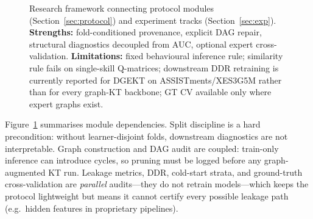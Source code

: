 \documentclass[runningheads]{llncs}
\newcommand{\DDR}{\textsc{DDR}}
\begin{document}
\begin{figure}[!t]
\centering
{}
\caption{Research framework connecting protocol modules (Section~\ref{sec:protocol})
and experiment tracks (Section~\ref{sec:exp}).
\textbf{Strengths:} fold-conditioned provenance, explicit DAG repair,
structural diagnostics decoupled from AUC, optional expert cross-validation.
\textbf{Limitations:} fixed behavioural inference rule; similarity rule
fails on single-skill Q-matrices; downstream \DDR{} retraining is currently
reported for DGEKT on ASSISTments/XES3G5M rather than for every graph-KT
backbone; GT CV available only where expert graphs exist.}
\label{fig:framework}
\end{figure}

Figure~\ref{fig:framework} summarises module dependencies. Split
discipline is a hard precondition: without learner-disjoint folds,
downstream diagnostics are not interpretable. Graph construction and DAG
audit are coupled: train-only inference can introduce cycles, so pruning
must be logged before any graph-augmented KT run. Leakage metrics,
\DDR{}, cold-start strata, and ground-truth cross-validation are
\emph{parallel} audits---they do not retrain models---which keeps the
protocol lightweight but means it cannot certify every possible leakage
path (e.g.\ hidden features in proprietary pipelines).
\end{document}
